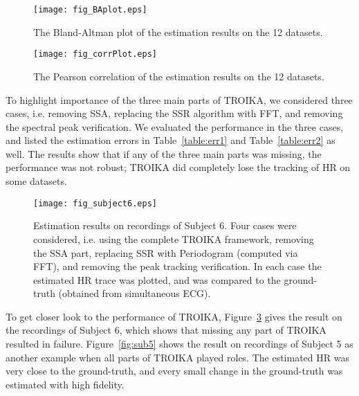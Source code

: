 \documentclass[10pt,twocolumn]{IEEEtran}
\begin{document}
\begin{figure}[t]
\centering
\texttt{[image: fig\_BAplot.eps]}
\caption{The Bland-Altman plot of the estimation results on the 12 datasets.}
\label{fig:BAplot}
\end{figure}

\begin{figure}[t]
\centering
\texttt{[image: fig\_corrPlot.eps]}
\caption{The Pearson correlation of the estimation results on the 12 datasets.}
\label{fig:corrPlot}
\end{figure}





To highlight importance of the three main parts of TROIKA,  we considered three cases, i.e. removing SSA, replacing the SSR algorithm with FFT, and removing the spectral peak verification. We evaluated the performance in the three cases, and listed the estimation errors in Table~\ref{table:err1} and Table~\ref{table:err2} as well. The results show that if any of the three main parts was missing, the performance was not robust; TROIKA did completely lose the tracking of HR on some datasets.



\begin{figure}[t]
\centering
\texttt{[image: fig\_subject6.eps]}
\caption{Estimation results on recordings of Subject 6. Four cases were considered, i.e. using the complete TROIKA framework, removing the SSA part, replacing SSR with Periodogram (computed via FFT), and removing the peak tracking verification. In each case the estimated HR trace was plotted, and was compared to the ground-truth (obtained from simultaneous ECG).}
\label{fig:sub6}
\end{figure}


To get closer look to the performance of TROIKA, Figure~\ref{fig:sub6} gives the result on the recordings of Subject 6, which shows that missing any part of TROIKA resulted in failure. Figure~\ref{fig:sub5} shows the result on recordings of Subject 5 as another example when all parts of TROIKA played roles. The estimated HR was very close to the ground-truth, and every small change in the ground-truth was estimated with high fidelity.
\end{document}
